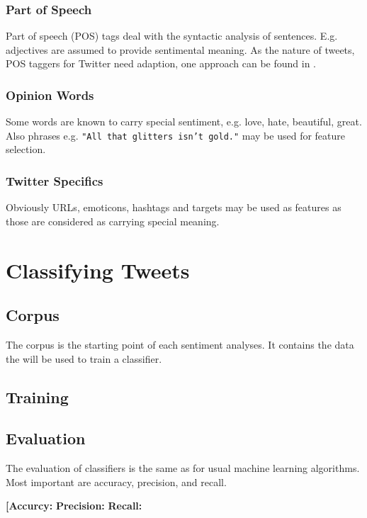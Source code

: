 \documentclass{acm_proc_article-sp}
\begin{document}
\subsubsection{Part of Speech}
Part of speech (POS) tags deal with the syntactic analysis of sentences. E.g. adjectives are assumed to provide sentimental meaning. \cite{liu2010sentimentanalysis} As the nature of tweets, POS taggers for Twitter need adaption, one approach can be found in \cite{gimpel2011part}. 

\subsubsection{Opinion Words}
Some words are known to carry special sentiment, e.g. love, hate, beautiful, great. Also phrases e.g. \texttt{"All that glitters isn't gold."} may be used for feature selection. \cite{liu2010sentimentanalysis}

\subsubsection{Twitter Specifics}
Obviously URLs, emoticons, hashtags and targets may be used as features as those are considered as carrying special meaning. \cite{gimpel2011part}

\section{Classifying Tweets} \label{classification}


\subsection{Corpus} The corpus is the starting point of each sentiment
analyses. It contains the data the will be used to train a classifier.


\subsection{Training}

\subsection{Evaluation}
The evaluation of classifiers is the same as for usual machine learning algorithms. Most important are accuracy, precision, and recall.

\textbf{[Accurcy:}
\textbf{Precision:}
\textbf{Recall:}
 
\end{document}
